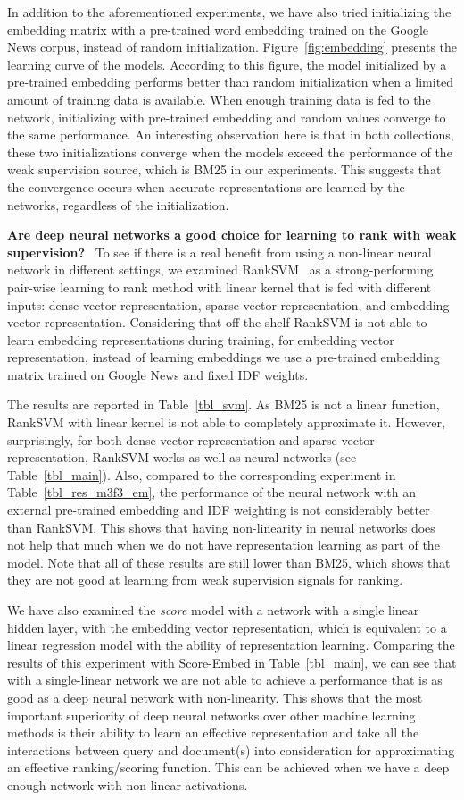 \documentclass[sigconf]{acmart}
\newcommand{\modelone}{\textit{score} model\xspace}
\newcommand{\mone}{Score\xspace}
\newcommand{\feedone}{dense vector representation\xspace}
\newcommand{\feedtwo}{sparse vector representation\xspace}
\newcommand{\feedthree}{embedding vector representation\xspace}
\newcommand{\fthree}{Embed\xspace}
\def\:{\hskip0pt} \newcommand{\mypar}[1]{\vspace*{-0.1ex}\medskip\noindent\textbf{#1}~}
\begin{document}
In addition to the aforementioned experiments, we have also tried initializing the embedding matrix with a pre-trained word embedding trained on the Google News corpus, instead of random initialization.
Figure~\ref{fig:embedding} presents the learning curve of the models. According to this figure, the model initialized by a pre-trained embedding performs better than random initialization when a limited amount of training data is available. 
When enough training data is fed to the network, initializing with pre-trained embedding and random values converge to the same performance.
An interesting observation here is that in both collections, these two initializations converge when the models exceed the performance of the weak supervision source, which is BM25 in our experiments. 
This suggests that the convergence occurs when accurate representations are learned by the networks, regardless of the initialization.




\mypar{Are deep neural networks a good choice for learning to rank with weak supervision?}
To see if there is a real benefit from using a non-linear neural network in different settings, we examined RankSVM~\citep{Joachims:2002} as a strong-performing pair-wise learning to rank method with linear kernel that is fed with different inputs: \feedone, \feedtwo, and \feedthree. Considering that off-the-shelf RankSVM is not able to learn embedding representations during training, for \feedthree, instead of learning embeddings we use a pre-trained embedding matrix trained on Google News and fixed IDF weights. 

The results are reported in Table~\ref{tbl_svm}. As BM25 is not a linear function, RankSVM with linear kernel is not able to completely approximate it. However, surprisingly, for both \feedone and \feedtwo, RankSVM works as well as neural networks (see Table~\ref{tbl_main}). 
Also, compared to the corresponding experiment in Table~\ref{tbl_res_m3f3_em}, the performance of the neural network with an external pre-trained embedding and IDF weighting is not considerably better than RankSVM. 
This shows that having non-linearity in neural networks does not help that much when we do not have representation learning as part of the model.
Note that all of these results are still lower than BM25, which shows that they are not good at learning from weak supervision signals for ranking. 


We have also examined the \modelone with a network with a single linear hidden layer, with the \feedthree, which is equivalent to a linear regression model with the ability of representation learning. 
Comparing the results of this experiment with \mone-\fthree in Table~\ref{tbl_main}, we can see that with a single-linear network we are not able to achieve a performance that is as good as a deep neural network with non-linearity.
This shows that the most important superiority of deep neural networks over other machine learning methods is their ability to learn an effective representation and take all the interactions between query and document(s) into consideration for approximating an effective ranking/scoring function. 
This can be achieved when we have a deep enough network with non-\:linear activations.
\end{document}
